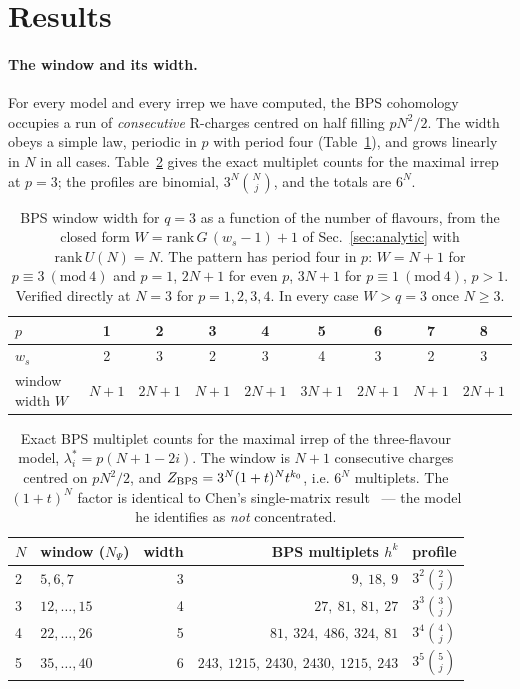 \documentclass[10pt]{article}
\newcommand{\rank}{\mathrm{rank}\,}
\begin{document}
\section{Results}\label{sec:results}

\paragraph{The window and its width.}
For every model and every irrep we have computed, the BPS cohomology occupies a run of \emph{consecutive} R-charges centred on half filling $pN^2/2$. The width obeys a simple law, periodic in $p$ with period four (Table~\ref{tab:widths}), and grows linearly in $N$ in all cases. Table~\ref{tab:profiles} gives the exact multiplet counts for the maximal irrep at $p=3$; the profiles are binomial, $3^N\binom Nj$, and the totals are $6^N$.

\begin{table}[tb]\centering\small
\begin{tabular}{lcccccccc}
\toprule
$p$ & 1 & 2 & 3 & 4 & 5 & 6 & 7 & 8\\
\midrule
$w_s$ & 2 & 3 & 2 & 3 & 4 & 3 & 2 & 3\\
window width $W$ & $N{+}1$ & $2N{+}1$ & $N{+}1$ & $2N{+}1$ & $3N{+}1$ & $2N{+}1$ & $N{+}1$ & $2N{+}1$\\
\bottomrule
\end{tabular}
\caption{BPS window width for $q=3$ as a function of the number of flavours, from the closed form $W=\rank G\,(w_s-1)+1$ of Sec.~\ref{sec:analytic} with $\rank U(N)=N$. The pattern has period four in $p$: $W=N+1$ for $p\equiv3\ (\mathrm{mod}\ 4)$ and $p=1$, $2N+1$ for even $p$, $3N+1$ for $p\equiv1\ (\mathrm{mod}\ 4)$, $p>1$. Verified directly at $N=3$ for $p=1,2,3,4$. In every case $W>q=3$ once $N\ge3$.}
\label{tab:widths}
\end{table}

\begin{table}[tb]\centering\small
\begin{tabular}{llrrl}
\toprule
$N$ & window ($N_\Psi$) & width & BPS multiplets $h^k$ & profile\\
\midrule
2 & $5,6,7$ & 3 & $9,\ 18,\ 9$ & $3^2\binom2j$\\
3 & $12,\dots,15$ & 4 & $27,\ 81,\ 81,\ 27$ & $3^3\binom3j$\\
4 & $22,\dots,26$ & 5 & $81,\ 324,\ 486,\ 324,\ 81$ & $3^4\binom4j$\\
5 & $35,\dots,40$ & 6 & $243,\ 1215,\ 2430,\ 2430,\ 1215,\ 243$ & $3^5\binom5j$\\
\bottomrule
\end{tabular}
\caption{Exact BPS multiplet counts for the maximal irrep of the three-flavour model, $\lambda^*_i=p(N+1-2i)$. The window is $N+1$ consecutive charges centred on $pN^2/2$, and $Z_{\rm BPS}=3^N(1+t)^Nt^{k_0}$, i.e. $6^N$ multiplets. The $(1+t)^N$ factor is identical to Chen's single-matrix result~\cite[(2.20)]{Chen:2025fortuity} --- the model he identifies as \emph{not} concentrated.}
\label{tab:profiles}
\end{table}
\end{document}
